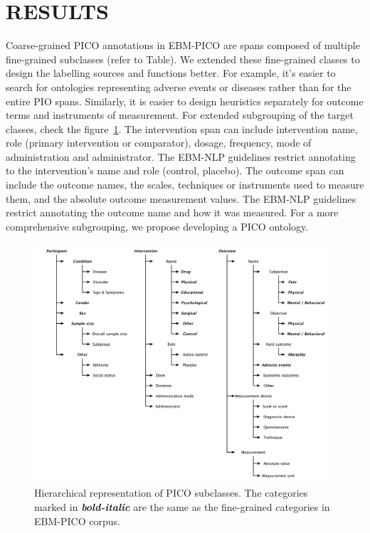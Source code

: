 \documentclass[10.7pt,]{article}
\begin{document}
\section{RESULTS}\label{results}
%
Coarse-grained PICO annotations in EBM-PICO are spans composed of multiple fine-grained subclasses (refer to Table).
We extended these fine-grained classes to design the labelling sources and functions better.
For example, it's easier to search for ontologies representing adverse events or diseases rather than for the entire PIO spans.
Similarly, it is easier to design heuristics separately for outcome terms and instruments of measurement.
For extended subgrouping of the target classes, check the figure~\ref{fig:target_subgroups}.
The intervention span can include intervention name, role (primary intervention or comparator), dosage, frequency, mode of administration and administrator.
The EBM-NLP guidelines restrict annotating to the intervention's name and role (control, placebo).
The outcome span can include the outcome names, the scales, techniques or instruments used to measure them, and the absolute outcome measurement values.
The EBM-NLP guidelines restrict annotating the outcome name and how it was measured.
For a more comprehensive subgrouping, we propose developing a PICO ontology.
%
\begin{figure}[ht]
\centering
\includegraphics[width=0.98\textwidth]{figures/target_subgroups_.pdf}
\caption{\label{fig:target_subgroups} Hierarchical representation of PICO subclasses. The categories marked in \textbf{\textit{bold-italic}} are the same as the fine-grained categories in EBM-PICO corpus.}
\end{figure}
\end{document}
